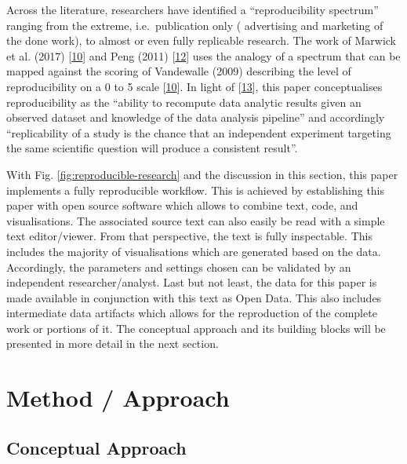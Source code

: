 \documentclass[conference,final,a4paper,]{IEEEtran}
\begin{document}
Across the literature, researchers have identified a ``reproducibility
spectrum'' ranging from the extreme, i.e.~publication only ( advertising
and marketing of the done work), to almost or even fully replicable
research. The work of Marwick et al. (2017)
{[}\protect\hyperlink{ref-marwick_2017}{10}{]} and Peng (2011)
{[}\protect\hyperlink{ref-Peng1226}{12}{]} uses the analogy of a
spectrum that can be mapped against the scoring of Vandewalle (2009)
describing the level of reproducibility on a 0 to 5 scale
{[}\protect\hyperlink{ref-marwick_2017}{10}{]}. In light of
{[}\protect\hyperlink{ref-leek_2015}{13}{]}, this paper conceptualises
reproducibility as the ``ability to recompute data analytic results
given an observed dataset and knowledge of the data analysis pipeline''
and accordingly ``replicability of a study is the chance that an
independent experiment targeting the same scientific question will
produce a consistent result''.

With Fig. \ref{fig:reproducible-research} and the discussion in this
section, this paper implements a fully reproducible workflow. This is
achieved by establishing this paper with open source software which
allows to combine text, code, and visualisations. The associated source
text can also easily be read with a simple text editor/viewer. From that
perspective, the text is fully inspectable. This includes the majority
of visualisations which are generated based on the data. Accordingly,
the parameters and settings chosen can be validated by an independent
researcher/analyst. Last but not least, the data for this paper is made
available in conjunction with this text as Open Data. This also includes
intermediate data artifacts which allows for the reproduction of the
complete work or portions of it. The conceptual approach and its
building blocks will be presented in more detail in the next section.

\section{Method / Approach}\label{method-approach}

\subsection{Conceptual Approach}\label{conceptual-approach}
\end{document}
